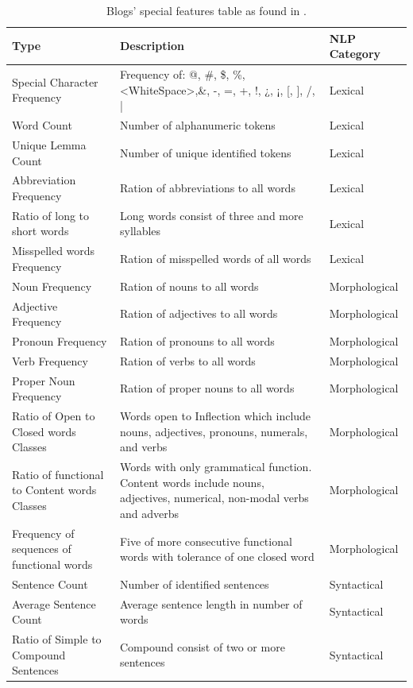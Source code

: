 \begin{table}[t]
	\center
	\caption {Blogs' special features table as found in \parencite{virik2017blog}.}\label{chap:relevant_work:tbl:blogs_special_features}
	\begin{tabular}{p{4cm}p{7cm}p{3cm}}
		\hline
		Type & Description & NLP Category \\
		\hline
		Special Character Frequency & Frequency of: @, \#, \$, \%, <WhiteSpace>,\&, -, =, +, !,  ¿, ¡, [, ], /, | & Lexical \\
		Word Count & Number of alphanumeric tokens & Lexical \\
        Unique Lemma Count & Number of unique identified tokens & Lexical \\
        Abbreviation Frequency & Ration of abbreviations to all words & Lexical \\
        Ratio of long to short words & Long words consist of three and more syllables & Lexical \\
        Misspelled words Frequency & Ration of misspelled words of all words & Lexical\\
		Noun Frequency & Ration of nouns to all words & Morphological \\
        Adjective Frequency & Ration of adjectives to all words & Morphological \\
        Pronoun Frequency & Ration of pronouns to all words & Morphological \\
        Verb Frequency & Ration of verbs to all words & Morphological \\
        Proper Noun Frequency & Ration of proper nouns to all words & Morphological \\
        Ratio of Open to Closed words Classes & Words open to Inflection which include nouns, adjectives, pronouns, numerals, and verbs  & Morphological \\
        Ratio of functional to Content words Classes & Words with only grammatical function. Content words include nouns, adjectives, numerical, non-modal verbs and adverbs  & Morphological \\
        Frequency of sequences of functional words & Five of more consecutive functional words with tolerance of one closed word & Morphological \\
		Sentence Count & Number of identified sentences & Syntactical \\
        Average Sentence Count & Average sentence length in number of words & Syntactical \\
        Ratio of Simple to Compound Sentences & Compound consist of two or more sentences & Syntactical \\

\end{tabular}
\end{table}
